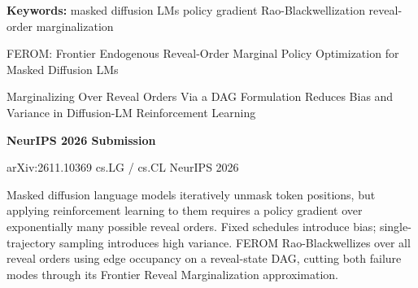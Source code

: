 \documentclass[10pt,twocolumn]{article}
\begin{document}
\setlength{\parindent}{0pt}
\setlength{\parskip}{4pt}

{\small\color{keywordgray}\textbf{Keywords:}
  masked diffusion LMs \textbullet{}
  policy gradient \textbullet{}
  Rao-Blackwellization \textbullet{}
  reveal-order marginalization}\par\vspace{4pt}

{\LARGE\bfseries\raggedright
  FEROM: Frontier Endogenous Reveal-Order Marginal Policy Optimization for Masked Diffusion LMs}\par\vspace{4pt}

{\large\itshape\raggedright
  Marginalizing Over Reveal Orders Via a DAG Formulation Reduces Bias and Variance
  in Diffusion-LM Reinforcement Learning}\par\vspace{6pt}

{\small\textbf{NeurIPS 2026 Submission}}\par\vspace{2pt}

{\small\color{keywordgray}arXiv:2611.10369 \textbullet{}
  cs.LG / cs.CL \textbullet{} NeurIPS 2026}
\par\vspace{2pt}\noindent{\color{rulered}\rule{\columnwidth}{0.6pt}}\vspace{6pt}

Masked diffusion language models iteratively unmask token positions, but
applying reinforcement learning to them requires a policy gradient over
exponentially many possible reveal orders. Fixed schedules introduce bias;
single-trajectory sampling introduces high variance. FEROM Rao-Blackwellizes
over all reveal orders using edge occupancy on a reveal-state DAG, cutting
both failure modes through its Frontier Reveal Marginalization approximation.
\end{document}
